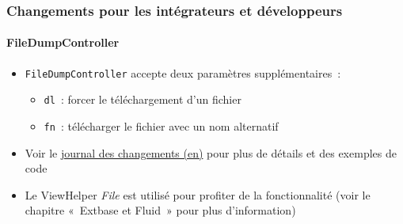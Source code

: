%

\begin{frame}[fragile]
	\frametitle{Changements pour les intégrateurs et développeurs}
	\framesubtitle{FileDumpController}

	\begin{itemize}
		\item \texttt{FileDumpController} accepte deux paramètres supplémentaires~:
			\begin{itemize}
				\item \texttt{dl}~: forcer le téléchargement d'un fichier
				\item \texttt{fn}~: télécharger le fichier avec un nom alternatif
			\end{itemize}
		\item Voir le
			\href{https://docs.typo3.org/c/typo3/cms-core/master/en-us/Changelog/11.3/Feature-92518-DownloadAndFilenameOptionsAddedToFileDumpController.html}{journal des changements (en)}
			pour plus de détails et des exemples de code
		\item Le ViewHelper \textit{File} est utilisé pour profiter de la fonctionnalité\newline
			\small(voir le chapitre «~Extbase et Fluid~» pour plus d'information)\normalsize

	\end{itemize}

\end{frame}

